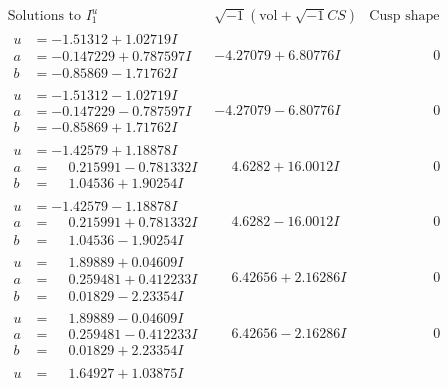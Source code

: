 \documentclass[1p]{elsarticle_modified}
\theoremstyle{definition}
\newcommand{\I}{\sqrt{-1}}
\begin{document}
$$\begin{array}{c|c|c}
\text{Solutions to }I^u_{1}& \I (\text{vol} + \sqrt{-1}CS) & \text{Cusp shape}\\
 \hline 
\begin{aligned}
u &= -1.51312 + 1.02719 I \\
a &= -0.147229 + 0.787597 I \\
b &= -0.85869 - 1.71762 I\end{aligned}
 & -4.27079 + 6.80776 I & \phantom{-0.000000 } 0 \\ \hline\begin{aligned}
u &= -1.51312 - 1.02719 I \\
a &= -0.147229 - 0.787597 I \\
b &= -0.85869 + 1.71762 I\end{aligned}
 & -4.27079 - 6.80776 I & \phantom{-0.000000 } 0 \\ \hline\begin{aligned}
u &= -1.42579 + 1.18878 I \\
a &= \phantom{-}0.215991 - 0.781332 I \\
b &= \phantom{-}1.04536 + 1.90254 I\end{aligned}
 & \phantom{-}4.6282 + 16.0012 I & \phantom{-0.000000 } 0 \\ \hline\begin{aligned}
u &= -1.42579 - 1.18878 I \\
a &= \phantom{-}0.215991 + 0.781332 I \\
b &= \phantom{-}1.04536 - 1.90254 I\end{aligned}
 & \phantom{-}4.6282 - 16.0012 I & \phantom{-0.000000 } 0 \\ \hline\begin{aligned}
u &= \phantom{-}1.89889 + 0.04609 I \\
a &= \phantom{-}0.259481 + 0.412233 I \\
b &= \phantom{-}0.01829 - 2.23354 I\end{aligned}
 & \phantom{-}6.42656 + 2.16286 I & \phantom{-0.000000 } 0 \\ \hline\begin{aligned}
u &= \phantom{-}1.89889 - 0.04609 I \\
a &= \phantom{-}0.259481 - 0.412233 I \\
b &= \phantom{-}0.01829 + 2.23354 I\end{aligned}
 & \phantom{-}6.42656 - 2.16286 I & \phantom{-0.000000 } 0 \\ \hline\begin{aligned}
u &= \phantom{-}1.64927 + 1.03875 I \\

\end{aligned}
\end{array}$$
\end{document}
